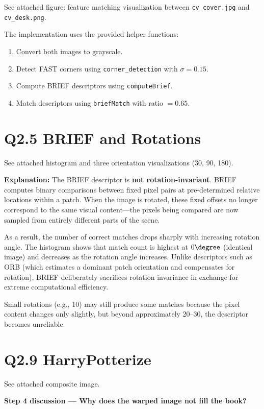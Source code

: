 \documentclass[12pt]{article}
\begin{document}
See attached figure: feature matching visualization between \texttt{cv\_cover.jpg} and \texttt{cv\_desk.png}.

The implementation uses the provided helper functions:
\begin{enumerate}
\item Convert both images to grayscale.
\item Detect FAST corners using \texttt{corner\_detection} with $\sigma = 0.15$.
\item Compute BRIEF descriptors using \texttt{computeBrief}.
\item Match descriptors using \texttt{briefMatch} with ratio $= 0.65$.
\end{enumerate}

\section*{Q2.5 BRIEF and Rotations}

See attached histogram and three orientation visualizations (30\textdegree, 90\textdegree, 180\textdegree).

\textbf{Explanation:} The BRIEF descriptor is \textbf{not rotation-invariant}. BRIEF computes binary comparisons between fixed pixel pairs at pre-determined relative locations within a patch. When the image is rotated, these fixed offsets no longer correspond to the same visual content—the pixels being compared are now sampled from entirely different parts of the scene.

As a result, the number of correct matches drops sharply with increasing rotation angle. The histogram shows that match count is highest at $0\degree$ (identical image) and decreases as the rotation angle increases. Unlike descriptors such as ORB (which estimates a dominant patch orientation and compensates for rotation), BRIEF deliberately sacrifices rotation invariance in exchange for extreme computational efficiency.

Small rotations (e.g., 10\textdegree) may still produce some matches because the pixel content changes only slightly, but beyond approximately 20--30\textdegree, the descriptor becomes unreliable.

\section*{Q2.9 HarryPotterize}

See attached composite image.

\textbf{Step 4 discussion --- Why does the warped image not fill the book?}
\end{document}
